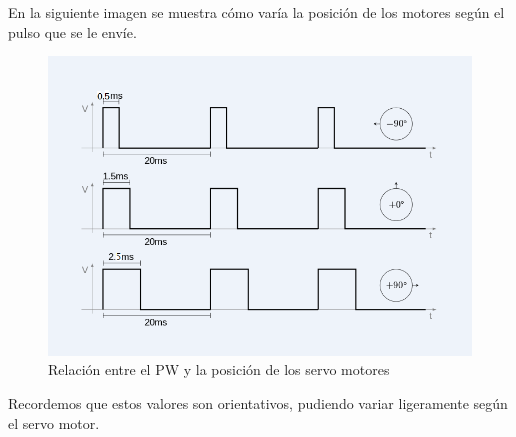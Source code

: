 \documentclass[twoside, 11pt]{epstfg}
\begin{document}
En la siguiente imagen se muestra cómo varía la posición de los motores según el pulso que se le envíe.

\begin{figure}[h!]
	\centerline{
		\mbox{\includegraphics[width=.80\textwidth]{images/PWMServos.png}}
	}
	\caption{Relación entre el PW y la posición de los servo motores}
	\label{figPWM}
\end{figure}

Recordemos que estos valores son orientativos, pudiendo variar ligeramente según el servo motor.

%
%
%
%
%
%
%
%
\end{document}
